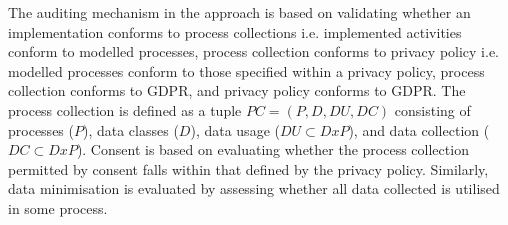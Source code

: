 The auditing mechanism in the approach is based on validating whether an implementation conforms to process collections i.e. implemented activities conform to modelled processes, process collection conforms to privacy policy i.e. modelled processes conform to those specified within a privacy policy, process collection conforms to GDPR, and privacy policy conforms to GDPR.
The process collection is defined as a tuple $PC = (P,D,DU,DC)$ consisting of processes ($P$), data classes ($D$), data usage ($DU\subset D x P$), and data collection ($DC\subset D x P$). Consent is based on evaluating whether the process collection permitted by consent falls within that defined by the privacy policy. Similarly, data minimisation is evaluated by assessing whether all data collected is utilised in some process.


